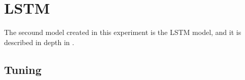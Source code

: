 \section{LSTM}
\label{section:Method:LSTM}

The secound model created in this experiment is the LSTM model,
and it is described in depth in .


\subsection{Tuning}


